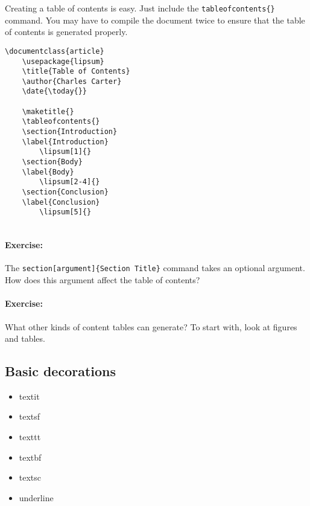         Creating a table of contents is easy. Just include the \texttt{tableofcontents\{\}} command. You may have to compile the document twice to ensure that the table of contents is generated properly.
        \begin{verbatim}
\documentclass{article}
    \usepackage{lipsum}
    \title{Table of Contents}
    \author{Charles Carter}
    \date{\today{}}
 
    \maketitle{}
    \tableofcontents{}
    \section{Introduction}
    \label{Introduction}
        \lipsum[1]{}
    \section{Body}
    \label{Body}
        \lipsum[2-4]{}
    \section{Conclusion}
    \label{Conclusion}
        \lipsum[5]{}
    
        \end{verbatim}

        \paragraph{Exercise:}The \texttt{section[argument]\{Section Title\}} command takes an optional argument. How does this argument affect the table of contents?

        \paragraph{Exercise:}What other kinds of content tables can \LaTeXe{} generate? To start with, look at figures and tables.

        \subsection{Basic decorations}
        \label{Basic decorations}
        
        \begin{framed}
            \begin{itemize}
                \item{textit}
                \item{textsf}
                \item{texttt}
                \item{textbf}
                \item{textsc}
                \item{underline}
            \end{itemize}
        \end{framed}

